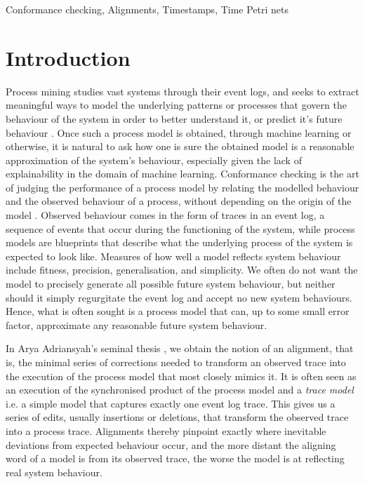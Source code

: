 \documentclass[conference]{IEEEtran}
\begin{document}
\begin{IEEEkeywords}
	Conformance checking, Alignments, Timestamps, Time Petri nets
\end{IEEEkeywords}

\section{Introduction} 

Process mining studies vast systems through their event logs, and seeks to extract meaningful ways to model the underlying patterns or processes that govern the behaviour of the system in order to better understand it, or predict it's future behaviour \cite{DBLP:books/sp/Aalst16} \cite{DBLP:books/sp/CarmonaDSW18}.
Once such a process model is obtained, through machine learning or otherwise, it is natural to ask how one is sure the obtained model is a reasonable approximation of the system’s behaviour, especially given the lack of explainability in the domain of machine learning.
Conformance checking is the art of judging the performance of a process model by relating the modelled behaviour and the observed behaviour of a process, without depending on the origin of the model \cite{DBLP:books/sp/CarmonaDSW18}.
Observed behaviour comes in the form of traces in an event log, a sequence of events that occur during the functioning of the system, while process models are blueprints that describe what the underlying process of the system is expected to look like.
Measures of how well a model reflects system behaviour include fitness, precision, generalisation, and simplicity.
We often do not want the model to precisely generate all possible future system behaviour, but neither should it simply regurgitate the event log and accept no new system behaviours. 
Hence, what is often sought is a process model that can, up to some small error factor, approximate any reasonable future system behaviour. 

In Arya Adriansyah's seminal thesis \cite{Adriansyah2014AligningOA}, we obtain the notion of an alignment, that is, the minimal series of corrections needed to transform an observed trace into the execution of the process model that most closely mimics it.  
It is often seen as an execution of the synchronised product of the process model and a \emph{trace model} i.e. a simple model that captures exactly one event log trace. 
This gives us a series of edits, usually insertions or deletions, that transform the observed trace  into a process trace.  
Alignments thereby pinpoint exactly where inevitable deviations from expected behaviour occur, and the more distant the aligning word of a model is from its observed trace, the worse the model is at reflecting real system behaviour. 
\end{document}
